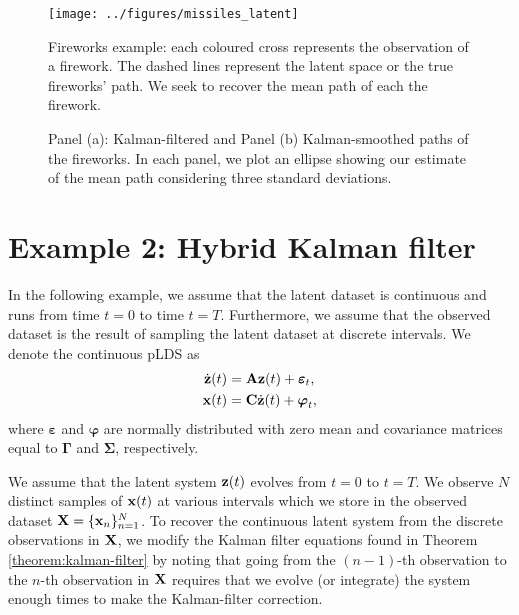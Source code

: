 \documentclass[12pt, oneside]{book}
\numberwithin{equation}{section}
\newcommand{\x}{{\bf x}}
\newcommand{\X}{{\bf X}}
\newcommand{\z}{{\bf z}}
\begin{document}
{\begin{figure}
	\centering
	\texttt{[image: ../figures/missiles\_latent]}
	\caption{Fireworks example: each coloured cross represents the observation of a firework. The dashed lines represent the latent space or the true fireworks' path. We seek to recover the mean path of each the firework.}
	\label{fig:fireworks-latent-observed}
\end{figure}

\begin{figure}
	\hfill
	\hfill
	\hfill
	\caption{Panel (a): Kalman-filtered and Panel (b) Kalman-smoothed paths of the fireworks. In each panel, we plot an ellipse showing our estimate of the mean path considering three standard deviations.}
	\label{fig:fireworks-filtered-smoothed}
\end{figure}


\section{Example 2: Hybrid Kalman filter}
In the following example, we assume that the latent dataset is continuous and runs from time $t=0$ to  time $t=T$. Furthermore, we assume that the observed dataset is the result of sampling the latent dataset at discrete intervals. We denote the continuous pLDS as
\begin{align}
	\dot{\z}(t) &= {\bf A}\z(t) + \boldsymbol{\varepsilon}_t,\\
	\x(t) &= {\bf C} \dot{\z}(t) + \boldsymbol{\varphi}_t,
\end{align}
where $\boldsymbol{\varepsilon}$ and $\boldsymbol{\varphi}$ are normally distributed with zero mean and covariance matrices equal to $\boldsymbol{\Gamma}$ and $\boldsymbol{\Sigma}$, respectively.

We assume that the latent system $\z(t)$ evolves from $t=0$ to $t=T$. We observe $N$ distinct samples of $\x(t)$ at various intervals which we store in the observed dataset $\X = \{\x_n\}_{n=1}^N$. To recover the continuous latent system from the discrete observations in $\X$, we modify the Kalman filter equations found in Theorem \ref{theorem:kalman-filter} by noting that going from the $(n-1)$-th observation to the $n$-th observation in $\X$ requires that we evolve (or integrate) the system enough times to make the Kalman-filter correction.

}
\end{document}
